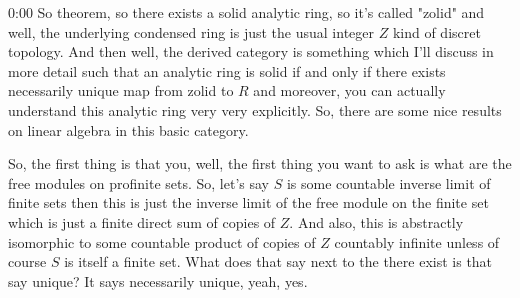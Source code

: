 \begin{unfinished}{0:00}
So theorem, so there exists a solid analytic ring, so it's called "zolid" and well, the underlying condensed ring is just the usual integer $Z$ kind of discret topology. And then well, the derived category is something which I'll discuss in more detail such that an analytic ring is solid if and only if there exists necessarily unique map from zolid to $R$ and moreover, you can actually understand this analytic ring very very explicitly. So, there are some nice results on linear algebra in this basic category.

So, the first thing is that you, well, the first thing you want to ask is what are the free modules on profinite sets. So, let's say $S$ is some countable inverse limit of finite sets then this is just the inverse limit of the free module on the finite set which is just a finite direct sum of copies of $Z$. And also, this is abstractly isomorphic to some countable product of copies of $Z$ countably infinite unless of course $S$ is itself a finite set. What does that say next to the there exist is that say unique? It says necessarily unique, yeah, yes. 


\end{unfinished}

